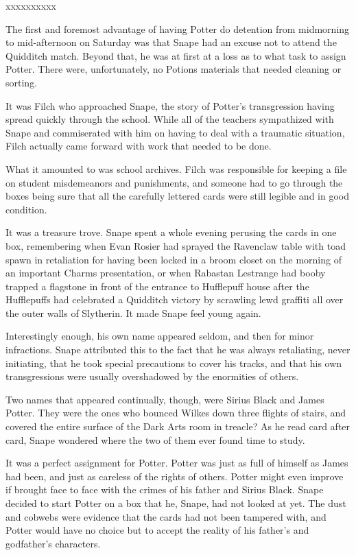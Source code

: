 \documentclass[a4paper,11pt]{article}
\begin{document}
xxxxxxxxxx

The first and foremost advantage of having Potter do detention from midmorning to mid-afternoon on Saturday was that Snape had an excuse not to attend the Quidditch match. Beyond that, he was at first at a loss as to what task to assign Potter. There were, unfortunately, no Potions materials that needed cleaning or sorting.

It was Filch who approached Snape, the story of Potter's transgression having spread quickly through the school. While all of the teachers sympathized with Snape and commiserated with him on having to deal with a traumatic situation, Filch actually came forward with work that needed to be done.

What it amounted to was school archives. Filch was responsible for keeping a file on student misdemeanors and punishments, and someone had to go through the boxes being sure that all the carefully lettered cards were still legible and in good condition.

It was a treasure trove. Snape spent a whole evening perusing the cards in one box, remembering when Evan Rosier had sprayed the Ravenclaw table with toad spawn in retaliation for having been locked in a broom closet on the morning of an important Charms presentation, or when Rabastan Lestrange had booby trapped a flagstone in front of the entrance to Hufflepuff house after the Hufflepuffs had celebrated a Quidditch victory by scrawling lewd graffiti all over the outer walls of Slytherin. It made Snape feel young again.

Interestingly enough, his own name appeared seldom, and then for minor infractions. Snape attributed this to the fact that he was always retaliating, never initiating, that he took special precautions to cover his tracks, and that his own transgressions were usually overshadowed by the enormities of others.

Two names that appeared continually, though, were Sirius Black and James Potter. They were the ones who bounced Wilkes down three flights of stairs, and covered the entire surface of the Dark Arts room in treacle? As he read card after card, Snape wondered where the two of them ever found time to study.

It was a perfect assignment for Potter. Potter was just as full of himself as James had been, and just as careless of the rights of others. Potter might even improve if brought face to face with the crimes of his father and Sirius Black. Snape decided to start Potter on a box that he, Snape, had not looked at yet. The dust and cobwebs were evidence that the cards had not been tampered with, and Potter would have no choice but to accept the reality of his father's and godfather's characters.
\end{document}
